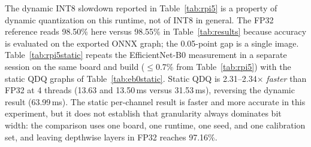 \documentclass[conference,a4paper]{IEEEtran}
\begin{document}
The dynamic INT8 slowdown reported in Table~\ref{tab:rpi5} is a property of dynamic quantization on this runtime, not of INT8 in general. The FP32 reference reads 98.50\% here versus 98.55\% in Table~\ref{tab:results} because accuracy is evaluated on the exported ONNX graph; the 0.05-point gap is a single image. Table~\ref{tab:rpi5static} repeats the EfficientNet-B0 measurement in a separate session on the same board and build (\mbox{$\le$}0.7\% from Table~\ref{tab:rpi5}) with the static QDQ graphs of Table~\ref{tab:eb0static}. Static QDQ is 2.31--2.34$\times$ \emph{faster} than FP32 at 4 threads (13.63 and 13.50\,ms versus 31.53\,ms), reversing the dynamic result (63.99\,ms). The static per-channel result is faster and more accurate in this experiment, but it does not establish that granularity always dominates bit width: the comparison uses one board, one runtime, one seed, and one calibration set, and leaving depthwise layers in FP32 reaches 97.16\%.

\begin{table}[htbp]
\caption{EfficientNet-B0 on Raspberry Pi~5, batch=1, mean of 200 runs after 10 warmup, CPUExecutionProvider only, ORT 1.29.0. Accuracy on exported ONNX graphs.}
\label{tab:rpi5static}
\centering
\footnotesize
\setlength{\tabcolsep}{4pt}
\end{table}
\end{document}
